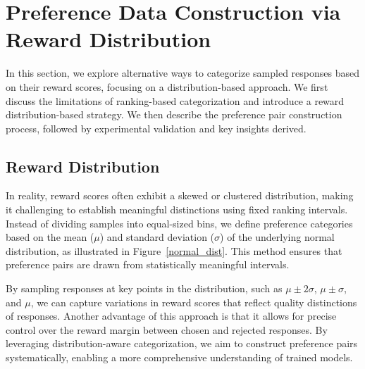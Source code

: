 
\section{Preference Data Construction via Reward Distribution}
\label{main_method}
In this section, we explore alternative ways to categorize sampled responses based on their reward scores, focusing on a distribution-based approach. 
We first discuss the limitations of ranking-based categorization and introduce a reward distribution-based strategy.
We then describe the preference pair construction process, followed by experimental validation and key insights derived.


\subsection{Reward Distribution}
In reality, reward scores often exhibit a skewed or clustered distribution, making it challenging to establish meaningful distinctions using fixed ranking intervals.
Instead of dividing samples into equal-sized bins, we define preference categories based on the mean (\(\mu\)) and standard deviation (\(\sigma\)) of the underlying normal distribution, as illustrated in Figure~\ref{normal_dist}. 
This method ensures that preference pairs are drawn from statistically meaningful intervals.

By sampling responses at key points in the distribution, such as \(\mu \pm 2\sigma\), \(\mu \pm \sigma\), and \(\mu\), we can capture variations in reward scores that reflect quality distinctions of responses. 
Another advantage of this approach is that it allows for precise control over the reward margin between chosen and rejected responses. 
By leveraging distribution-aware categorization, we aim to construct preference pairs systematically, enabling a more comprehensive understanding of trained models. 

